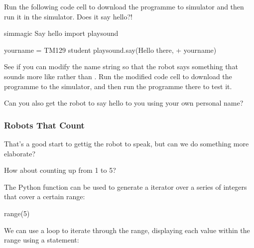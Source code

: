 \documentclass[letterpaper,10pt,english]{sphinxmanual}
\begin{document}
Run the following code cell to download the programme to simulator and then run it in the simulator. Does it say hello?!

{
\begin{sphinxVerbatim}[commandchars=\\\{\}]
\llap{\color{nbsphinxin}[ ]:\,\hspace{\fboxrule}\hspace{\fboxsep}}\PYGZpc{}\PYGZpc{}sim\PYGZus{}magic
\PYGZsh{} Say hello
import playsound

your\PYGZus{}name = \PYGZdq{}TM129 student\PYGZdq{}
playsound.say(\PYGZdq{}Hello there,\PYGZdq{} + your\PYGZus{}name)
\end{sphinxVerbatim}
}

See if you can modify the name string so that the robot says something that sounds more like  rather than . Run the modified code cell to download the programme to the simulator, and then run the programme there to test it.

Can you also get the robot to say hello to you using your own personal name?


\subsubsection{Robots That Count}
\label{\detokenize{content/00_SOFTWARE_GUIDE/Section_00_03_quick_practical_tour:Robots-That-Count}}
That’s a good start to gettig the robot to speak, but can we do something more elaborate?

How about counting up from 1 to 5?

The Python  function can be used to generate a iterator over a series of integers that cover a certain range:

{
\begin{sphinxVerbatim}[commandchars=\\\{\}]
\llap{\color{nbsphinxin}[ ]:\,\hspace{\fboxrule}\hspace{\fboxsep}}range(5)
\end{sphinxVerbatim}
}

We can use a  loop to iterate through the range, displaying each value within the range using a  statement:
\end{document}
